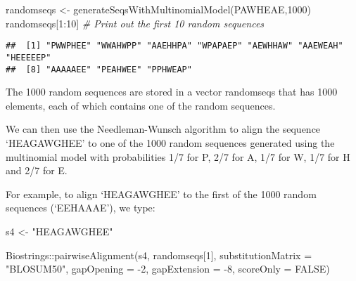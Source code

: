 \documentclass[
]{book}
\newenvironment{Shaded}{\begin{snugshade}}{\end{snugshade}}
\newcommand{\AttributeTok}[1]{\textcolor[rgb]{0.77,0.63,0.00}{#1}}
\newcommand{\CommentTok}[1]{\textcolor[rgb]{0.56,0.35,0.01}{\textit{#1}}}
\newcommand{\ConstantTok}[1]{\textcolor[rgb]{0.00,0.00,0.00}{#1}}
\newcommand{\DecValTok}[1]{\textcolor[rgb]{0.00,0.00,0.81}{#1}}
\newcommand{\FunctionTok}[1]{\textcolor[rgb]{0.00,0.00,0.00}{#1}}
\newcommand{\NormalTok}[1]{#1}
\newcommand{\OtherTok}[1]{\textcolor[rgb]{0.56,0.35,0.01}{#1}}
\newcommand{\SpecialCharTok}[1]{\textcolor[rgb]{0.00,0.00,0.00}{#1}}
\newcommand{\StringTok}[1]{\textcolor[rgb]{0.31,0.60,0.02}{#1}}
\begin{document}
\begin{Shaded}
\begin{Highlighting}[]
\NormalTok{randomseqs }\OtherTok{\textless{}{-}} \FunctionTok{generateSeqsWithMultinomialModel}\NormalTok{(}\StringTok{\textquotesingle{}PAWHEAE\textquotesingle{}}\NormalTok{,}\DecValTok{1000}\NormalTok{)}
\NormalTok{randomseqs[}\DecValTok{1}\SpecialCharTok{:}\DecValTok{10}\NormalTok{] }\CommentTok{\# Print out the first 10 random sequences}
\end{Highlighting}
\end{Shaded}

\begin{verbatim}
##  [1] "PWWPHEE" "WWAHWPP" "AAEHHPA" "WPAPAEP" "AEWHHAW" "AAEWEAH" "HEEEEEP"
##  [8] "AAAAAEE" "PEAHWEE" "PPHWEAP"
\end{verbatim}

The 1000 random sequences are stored in a vector randomseqs that has 1000 elements, each of which contains one of the random sequences.

We can then use the Needleman-Wunsch algorithm to align the sequence `HEAGAWGHEE' to one of the 1000 random sequences generated using the multinomial model with probabilities 1/7 for P, 2/7 for A, 1/7 for W, 1/7 for H and 2/7 for E.

For example, to align `HEAGAWGHEE' to the first of the 1000 random sequences (`EEHAAAE'), we type:

\begin{Shaded}
\begin{Highlighting}[]
\NormalTok{s4 }\OtherTok{\textless{}{-}} \StringTok{"HEAGAWGHEE"}
\end{Highlighting}
\end{Shaded}

\begin{Shaded}
\begin{Highlighting}[]
\NormalTok{Biostrings}\SpecialCharTok{::}\FunctionTok{pairwiseAlignment}\NormalTok{(s4, randomseqs[}\DecValTok{1}\NormalTok{], }
                              \AttributeTok{substitutionMatrix =} \StringTok{"BLOSUM50"}\NormalTok{, }
                              \AttributeTok{gapOpening =} \SpecialCharTok{{-}}\DecValTok{2}\NormalTok{,}
                              \AttributeTok{gapExtension =} \SpecialCharTok{{-}}\DecValTok{8}\NormalTok{, }
                              \AttributeTok{scoreOnly =} \ConstantTok{FALSE}\NormalTok{)}
\end{Highlighting}
\end{Shaded}
\end{document}
